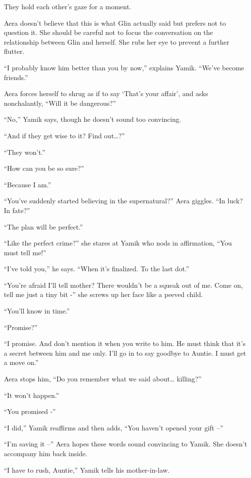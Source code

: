 \documentclass[twoside,11pt]{book}
\begin{document}
They hold each other's gaze for a moment.

Aera doesn't believe that this is what Glin actually said but prefers not to question it. She should be careful not to
focus the conversation on the relationship between Glin and herself. She rubs her eye to prevent a further flutter.

``I probably know him better than you by now,'' explains Yamik. ``We've become
friends.''

Aera forces herself to shrug as if to say `That's your affair', and asks nonchalantly, ``Will it be
dangerous?''

``No,'' Yamik says, though he doesn't sound too convincing.

``And if they get wise to it? Find out{\dots}?''

``They won't.'' \

``How can you be so sure?''

``Because I am.''

``You've suddenly started believing in the supernatural?'' Aera giggles. ``In
luck? In fate?''

``The plan will be perfect.''

``Like the perfect crime?'' she stares at Yamik who nods in affirmation, ``You must tell me!''


``I've told you,'' he says. ``When it's finalized.  To the last dot.''

``You're afraid I'll tell mother? There wouldn't be a squeak out of me. Come on, tell me just a tiny bit
-'' she screws up her face like a peeved child.

``You'll know in time.''

``Promise?''

``I promise. And don't mention it when you write to him. He must think that it's a secret between him and
me only. I'll go in to say goodbye to Auntie. I must get a move on.''

Aera stops him, ``Do you remember what we said about{\dots} killing?''

``It won't happen.''

``You promised -''

``I did,'' Yamik reaffirms and then adds, ``You haven't opened your gift
--''

``I'm saving it --'' Aera hopes these words sound convincing to Yamik. She doesn't accompany
him back inside.

``I have to rush, Auntie,'' Yamik tells his mother-in-law.
\end{document}
